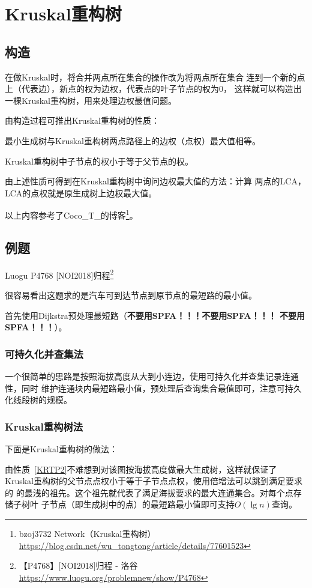 \section{Kruskal重构树}
\subsection{构造}
在做Kruskal时，将合并两点所在集合的操作改为将两点所在集合
连到一个新的点上（代表边），新点的权为边权，代表点的叶子节点的权为0，
这样就可以构造出一棵Kruskal重构树，用来处理边权最值问题。

由构造过程可推出Kruskal重构树的性质：

\begin{property}
	最小生成树与Kruskal重构树两点路径上的边权（点权）最大值相等。
\end{property}
\begin{property}\label{KRTP2}
	Kruskal重构树中子节点的权小于等于父节点的权。
\end{property}
由上述性质可得到在Kruskal重构树中询问边权最大值的方法：计算
两点的LCA，LCA的点权就是原生成树上边权最大值。

以上内容参考了Coco\_T\_的博客\footnote{
	bzoj3732 Network（Kruskal重构树）
	\url{https://blog.csdn.net/wu_tongtong/article/details/77601523}
}。
\subsection{例题}
Luogu P4768 [NOI2018]归程\footnote{
【P4768】[NOI2018]归程 - 洛谷
\url{https://www.luogu.org/problemnew/show/P4768}
}

很容易看出这题求的是汽车可到达节点到原节点的最短路的最小值。

首先使用Dijkstra预处理最短路（{\bfseries 不要用SPFA！！！不要用SPFA！！！
不要用SPFA！！！}）。

\subsubsection{可持久化并查集法}
一个很简单的思路是按照海拔高度从大到小连边，使用可持久化并查集记录连通性，同时
维护连通块内最短路最小值，预处理后查询集合最值即可，注意可持久化线段树的规模。

\subsubsection{Kruskal重构树法}
下面是Kruskal重构树的做法：

由性质~\ref{KRTP2}不难想到对该图按海拔高度做最大生成树，这样就保证了
Kruskal重构树的父节点点权小于等于子节点点权，使用倍增法可以跳到满足要求的
的最浅的祖先。这个祖先就代表了满足海拔要求的最大连通集合。对每个点存储子树叶
子节点（即生成树中的点）的最短路最小值即可支持$O(\lg n)$查询。

